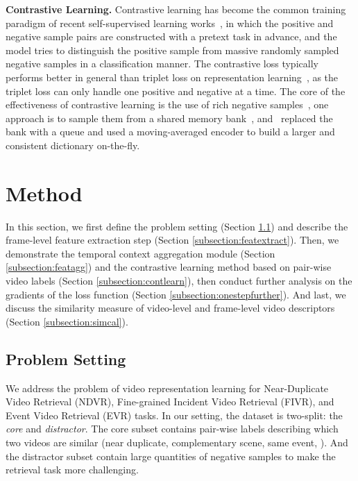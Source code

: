 \documentclass[10pt,twocolumn,letterpaper]{article}
\begin{document}
\textbf{Contrastive Learning.}
Contrastive learning has become the common training paradigm of recent self-supervised learning works~\cite{oord2018representation,hjelm2018learning,tian2019contrastive,he2019momentum,chen2020simple}, in which the positive and negative sample pairs are constructed with a pretext task in advance, and the model tries to distinguish the positive sample from massive randomly sampled negative samples in a classification manner. The contrastive loss typically performs better in general than triplet loss on representation learning~\cite{chen2020simple}, as the triplet loss can only handle one positive and negative at a time. The core of the effectiveness of contrastive learning is the use of rich negative samples~\cite{tian2019contrastive}, one approach is to sample them from a shared memory bank~\cite{wu2018unsupervised}, and~\cite{he2019momentum} replaced the bank with a queue and used a moving-averaged encoder to build a larger and consistent dictionary on-the-fly.


\section{Method} \label{section:method}
In this section, we ﬁrst deﬁne the problem setting (Section \ref{subsection:probset}) and describe the frame-level feature extraction step (Section \ref{subsection:featextract}). Then, we demonstrate the temporal context aggregation module (Section \ref{subsection:featagg}) and the contrastive learning method based on pair-wise video labels (Section \ref{subsection:contlearn}), then conduct further analysis on the gradients of the loss function (Section \ref{subsection:onestepfurther}). And last, we discuss the similarity measure of video-level and frame-level video descriptors (Section \ref{subsection:simcal}).

\subsection{Problem Setting} \label{subsection:probset}


We address the problem of video representation learning for Near-Duplicate Video Retrieval (NDVR), Fine-grained Incident Video Retrieval (FIVR), and Event Video Retrieval (EVR) tasks. In our setting, the dataset is two-split: the \textit{core} and \textit{distractor}. The core subset contains pair-wise labels describing which two videos are similar (near duplicate, complementary scene, same event, \etc). And the distractor subset contain large quantities of negative samples to make the retrieval task more challenging.
\end{document}

